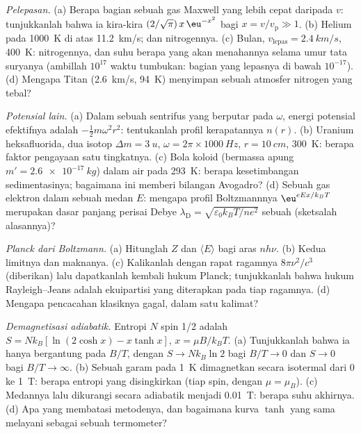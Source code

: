 \begin{exercise}[$\star\star$]\label{exo:b2:boltzmann-factor:9}
\emph{Pelepasan.} (a) Berapa bagian sebuah gas Maxwell yang lebih cepat daripada $v$: tunjukkanlah bahwa ia
kira-kira $(2/\sqrt\pi)\,x\,\eu^{-x^2}$ bagi $x = v/v_{\text{p}} \gg 1$.
(b) Helium pada \qty{1000}{K} di atas \qty{11.2}{km/s}; dan nitrogennya. (c) Bulan,
$v_{\text{lepas}} = \qty{2.4}{km/s}$, \qty{400}{K}: nitrogennya, dan suhu
berapa yang akan menahannya selama umur tata suryanya (ambillah $10^{17}$
waktu tumbukan: bagian yang lepasnya di bawah $10^{-17}$). (d) Mengapa Titan
(\qty{2.6}{km/s}, \qty{94}{K}) menyimpan sebuah atmosfer nitrogen yang tebal?
\end{exercise}

\begin{exercise}[$\star\star\star$]\label{exo:b2:boltzmann-factor:10}
\emph{Potensial lain.} (a) Dalam sebuah sentrifus yang berputar pada $\omega$,
energi potensial efektifnya adalah $-\tfrac12m\omega^2r^2$: tentukanlah profil kerapatannya
$n(r)$. (b) Uranium heksafluorida, dua isotop $\Delta m = \qty{3}{u}$, $\omega
= 2\pi \times \qty{1000}{Hz}$, $r = \qty{10}{cm}$, \qty{300}{K}: berapa faktor
pengayaan satu tingkatnya. (c) Bola koloid (bermassa apung $m' =
\qty{2.6e-17}{kg}$) dalam air pada \qty{293}{K}: berapa 
kesetimbangan sedimentasinya; bagaimana ini memberi bilangan Avogadro? (d) Sebuah
gas elektron dalam sebuah medan $E$: mengapa profil Boltzmannnya
$\eu^{eEx/k_BT}$ merupakan dasar panjang perisai Debye
$\lambda_{\text{D}} = \sqrt{\varepsilon_0k_BT/ne^2}$ sebuah  (sketsalah
alasannya)?
\end{exercise}

\begin{exercise}[$\star\star\star$]\label{exo:b2:boltzmann-factor:11}
\emph{Planck dari Boltzmann.} (a) Hitunglah $Z$ dan $\langle E\rangle$ bagi
aras $nh\nu$. (b) Kedua limitnya dan maknanya. (c) Kalikanlah dengan
rapat ragamnya $8\pi\nu^2/c^3$ (diberikan) lalu dapatkanlah kembali hukum Planck;
tunjukkanlah bahwa hukum Rayleigh--Jeans adalah ekuipartisi yang diterapkan pada tiap ragamnya.
(d) Mengapa pencacahan klasiknya gagal, dalam satu kalimat?
\end{exercise}

\begin{exercise}[$\star\star\star$]\label{exo:b2:boltzmann-factor:12}
\emph{Demagnetisasi adiabatik.} Entropi $N$ spin 1/2 adalah $S =
Nk_B[\ln(2\cosh x) - x\tanh x]$, $x = \mu B/k_BT$. (a) Tunjukkanlah bahwa ia hanya bergantung
pada $B/T$, dengan $S \to Nk_B\ln 2$ bagi $B/T \to 0$ dan $S \to 0$ bagi $B/T
\to \infty$. (b) Sebuah garam pada \qty{1}{K} dimagnetkan secara isotermal dari $0$ ke
\qty{1}{T}: berapa entropi yang disingkirkan (tiap spin, dengan $\mu = \mu_B$). (c) Medannya
lalu dikurangi secara adiabatik menjadi \qty{0.01}{T}: berapa suhu akhirnya. (d)
Apa yang membatasi metodenya, dan bagaimana kurva $\tanh$ yang sama melayani sebagai
sebuah termometer?
\end{exercise}

